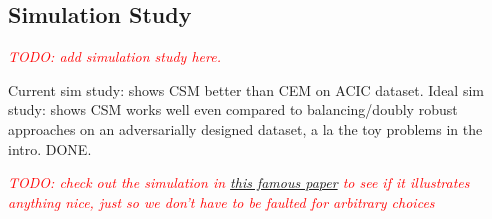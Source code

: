 \documentclass{article}
\newcommand{\note}[1]{\textcolor{red}{\textit{#1}}}
\begin{document}
\subsection{Simulation Study}

\note{TODO: add simulation study here.}

Current sim study: shows CSM better than CEM on ACIC dataset.
Ideal sim study: shows CSM works well even compared to balancing/doubly robust approaches on an adversarially designed dataset, a la the toy problems in the intro. DONE.

\note{TODO: check out the simulation in \href{https://arxiv.org/pdf/0804.2958.pdf}{this famous paper} to see if it illustrates anything nice, just so we don't have to be faulted for arbitrary choices}


\end{document}
